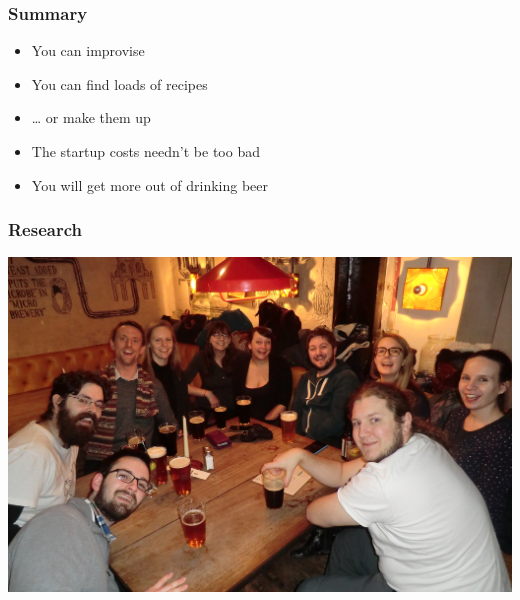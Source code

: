 \documentclass{beamer}
\begin{document}
\begin{frame}[label=summary]
  \frametitle{Summary}
  \begin{itemize}
  \item You can improvise
  \item You can find loads of recipes
  \item \ldots{} or make them up
  \item The startup costs needn't be too bad
  \item You will get more out of drinking beer
\end{itemize}
\end{frame}

\begin{frame}
  \frametitle{Research}
  \begin{center}
    \includegraphics[height=0.9\textheight]{CIMG4062.JPG}
  \end{center}
\end{frame}
\end{document}
